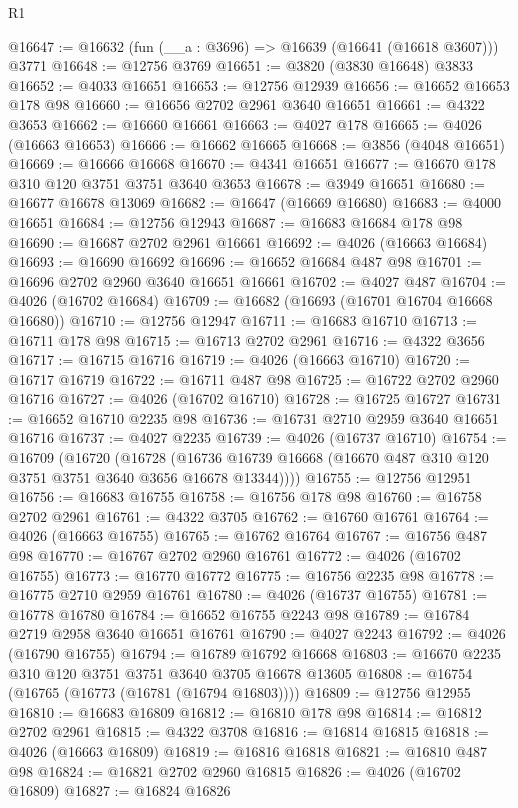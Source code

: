 \begin{lexlean}{R1}
\begin{coremodule}
@16647 := @16632 (fun (__a : @3696) => @16639 (@16641 (@16618 @3607))) @3771
@16648 := @12756 @3769
@16651 := @3820 (@3830 @16648) @3833
@16652 := @4033 @16651
@16653 := @12756 @12939
@16656 := @16652 @16653 @178 @98
@16660 := @16656 @2702 @2961 @3640 @16651
@16661 := @4322 @3653
@16662 := @16660 @16661
@16663 := @4027 @178
@16665 := @4026 (@16663 @16653)
@16666 := @16662 @16665
@16668 := @3856 (@4048 @16651)
@16669 := @16666 @16668
@16670 := @4341 @16651
@16677 := @16670 @178 @310 @120 @3751 @3751 @3640 @3653
@16678 := @3949 @16651
@16680 := @16677 @16678 @13069
@16682 := @16647 (@16669 @16680)
@16683 := @4000 @16651
@16684 := @12756 @12943
@16687 := @16683 @16684 @178 @98
@16690 := @16687 @2702 @2961 @16661
@16692 := @4026 (@16663 @16684)
@16693 := @16690 @16692
@16696 := @16652 @16684 @487 @98
@16701 := @16696 @2702 @2960 @3640 @16651 @16661
@16702 := @4027 @487
@16704 := @4026 (@16702 @16684)
@16709 := @16682 (@16693 (@16701 @16704 @16668 @16680))
@16710 := @12756 @12947
@16711 := @16683 @16710
@16713 := @16711 @178 @98
@16715 := @16713 @2702 @2961
@16716 := @4322 @3656
@16717 := @16715 @16716
@16719 := @4026 (@16663 @16710)
@16720 := @16717 @16719
@16722 := @16711 @487 @98
@16725 := @16722 @2702 @2960 @16716
@16727 := @4026 (@16702 @16710)
@16728 := @16725 @16727
@16731 := @16652 @16710 @2235 @98
@16736 := @16731 @2710 @2959 @3640 @16651 @16716
@16737 := @4027 @2235
@16739 := @4026 (@16737 @16710)
@16754 := @16709
    (@16720
      (@16728 (@16736 @16739 @16668 (@16670 @487 @310 @120 @3751 @3751 @3640 @3656 @16678 @13344))))
@16755 := @12756 @12951
@16756 := @16683 @16755
@16758 := @16756 @178 @98
@16760 := @16758 @2702 @2961
@16761 := @4322 @3705
@16762 := @16760 @16761
@16764 := @4026 (@16663 @16755)
@16765 := @16762 @16764
@16767 := @16756 @487 @98
@16770 := @16767 @2702 @2960 @16761
@16772 := @4026 (@16702 @16755)
@16773 := @16770 @16772
@16775 := @16756 @2235 @98
@16778 := @16775 @2710 @2959 @16761
@16780 := @4026 (@16737 @16755)
@16781 := @16778 @16780
@16784 := @16652 @16755 @2243 @98
@16789 := @16784 @2719 @2958 @3640 @16651 @16761
@16790 := @4027 @2243
@16792 := @4026 (@16790 @16755)
@16794 := @16789 @16792 @16668
@16803 := @16670 @2235 @310 @120 @3751 @3751 @3640 @3705 @16678 @13605
@16808 := @16754 (@16765 (@16773 (@16781 (@16794 @16803))))
@16809 := @12756 @12955
@16810 := @16683 @16809
@16812 := @16810 @178 @98
@16814 := @16812 @2702 @2961
@16815 := @4322 @3708
@16816 := @16814 @16815
@16818 := @4026 (@16663 @16809)
@16819 := @16816 @16818
@16821 := @16810 @487 @98
@16824 := @16821 @2702 @2960 @16815
@16826 := @4026 (@16702 @16809)
@16827 := @16824 @16826

\end{coremodule}
\end{lexlean}
